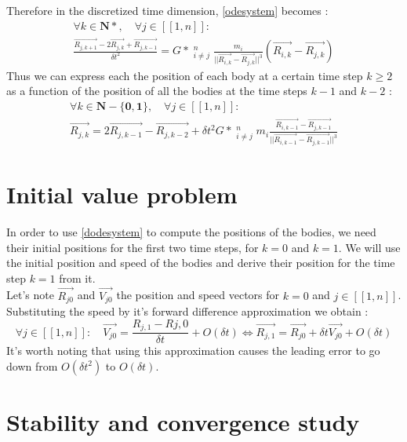 \documentclass[a4paper,11pt]{article}
\begin{document}
Therefore in the discretized time dimension, \eqref{odesystem} becomes :
\begin{multline}
  \forall k \in \mathbf{N*},\quad \forall j \in [[1, n]]:\\
  \frac{\vec{R_{j,k+1}} - 2 \vec{R_{j,k}} + \vec{R_{j,k-1}}}{\delta t^2} =
  G*\mathop{\sum_{i=1}}_{i \ne j}^n \frac{m_i}{||{\vec{R_{i,k}} - \vec{R_{j,k}}}||^3}
  (\vec{R_{i,k}} - \vec{R_{j,k}})
\end{multline}
Thus we can express each the position of each body at a certain time step $k \ge 2$
as a function of the position of all the bodies at the time steps $k - 1$ and $k - 2$ :
\begin{multline}
  \forall k \in \mathbf{N-\{0,1\}},\quad \forall j \in [[1, n]]:\\
  \vec{R_{j,k}} = 2 \vec{R_{j,k-1}} - \vec{R_{j,k-2}} +
  \delta t^2 G* \mathop{\sum_{i=1}}_{i \ne j}^n m_i
  \frac{\vec{R_{i,k-1}} - \vec{R_{j,k-1}}}{||{\vec{R_{i,k-1}} - \vec{R_{j,k-1}}}||^3}
  \label{dodesystem}
\end{multline}
\section{Initial value problem}
In order to use \eqref{dodesystem} to compute the positions of the bodies, we need their
initial positions for the first two time steps, for $k = 0$ and $k = 1$.
We will use the initial position and speed of the bodies and derive their position
for the time step $k = 1$ from it.\\
Let's note $\vec{R_{j0}}$ and $\vec{V_{j0}}$ the
position and speed vectors for $k=0$ and \linebreak[4] $j \in [[1, n]]$.
Substituting the speed by it's forward difference approximation we obtain :
\begin{equation}
  \forall j \in [[1, n]]: \quad
  \vec{V_{j0}} = \frac{R_{j,1} - R{j, 0}}{\delta t} + O(\delta t)
  \Leftrightarrow
  \vec{R_{j,1}} = \vec{R_{j0}} + \delta t \vec{V_{j0}} + O(\delta t)
\end{equation}
It's worth noting that using this approximation causes the leading error to go
down from $O(\delta t^2)$ to $O(\delta t)$.
\section{Stability and convergence study}
\end{document}
